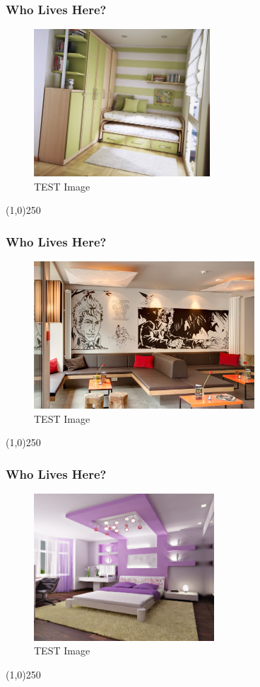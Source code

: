 \begin{frame}
\frametitle{Who Lives Here?}
\begin{figure}
	\centering
		\includegraphics[height=5.5cm]{img/G.jpg}
	\caption{TEST Image}
	\label{fig:SampleG}
\end{figure}
\end{frame}
\begin{center}\line(1,0){250}\end{center}




\begin{frame}
\frametitle{Who Lives Here?}
\begin{figure}
	\centering
		\includegraphics[height=5.5cm]{img/H.jpg}
	\caption{TEST Image}
	\label{fig:SampleH}
\end{figure}
\end{frame}
\begin{center}\line(1,0){250}\end{center}




\begin{frame}
\frametitle{Who Lives Here?}
\begin{figure}
	\centering
		\includegraphics[height=5.5cm]{img/H.png}
	\caption{TEST Image}
	\label{fig:SampleH2}
\end{figure}
\end{frame}
\begin{center}\line(1,0){250}\end{center}



